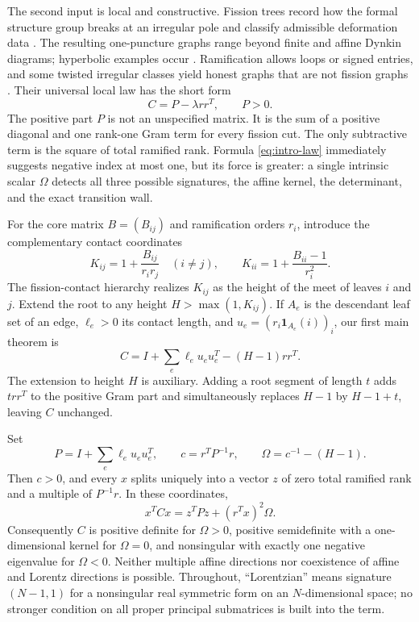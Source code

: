 \documentclass[11pt,a4paper]{amsart}
\theoremstyle{plain}
\theoremstyle{definition}
\newcommand{\one}{\mathbf 1}
\begin{document}
The second input is local and constructive.  Fission trees record how the formal structure group
breaks at an irregular pole and classify admissible deformation data
\cite{Boalch2008Kac,BoalchDoucotRembado2025,Boalch2025Counting}.  The resulting one-puncture graphs
range beyond finite and affine Dynkin diagrams; hyperbolic examples occur
\cite{Boalch2012Simply,Boalch2025Counting}.  Ramification allows loops or signed entries, and some
twisted irregular classes yield honest graphs that are not fission graphs
\cite{Doucot2025Graphs}.  Their universal local law has the short form
\begin{equation}\label{eq:intro-law}
 \boxed{\quad C=P-\lambda rr^T,\qquad P>0.\quad}
\end{equation}
The positive part $P$ is not an unspecified matrix.  It is the sum of a positive diagonal and one
rank-one Gram term for every fission cut.  The only subtractive term is the square of total
ramified rank.  Formula \eqref{eq:intro-law} immediately suggests negative index at most one, but
its force is greater: a single intrinsic scalar $\Omega$ detects all three possible signatures,
the affine kernel, the determinant, and the exact transition wall.

For the core matrix $B=(B_{ij})$ and ramification orders $r_i$, introduce the complementary
contact coordinates
\begin{equation}\label{eq:intro-K}
 K_{ij}=1+\frac{B_{ij}}{r_ir_j}\quad(i\ne j),\qquad
 K_{ii}=1+\frac{B_{ii}-1}{r_i^2}.
\end{equation}
The fission-contact hierarchy realizes $K_{ij}$ as the height of the meet of leaves $i$ and $j$.
Extend the root to any height $H>\max(1,K_{ij})$.  If $A_e$ is the descendant leaf set of an edge,
$\ell_e>0$ its contact length, and $u_e=(r_i\one_{A_e}(i))_i$, our first main theorem is
\begin{equation}\label{eq:intro-factor}
 C=I+\sum_e\ell_eu_eu_e^T-(H-1)rr^T.
\end{equation}
The extension to height $H$ is auxiliary.  Adding a root segment of length $t$ adds $t rr^T$ to
the positive Gram part and simultaneously replaces $H-1$ by $H-1+t$, leaving $C$ unchanged.

Set
\begin{equation}\label{eq:intro-capacity}
 P=I+\sum_e\ell_eu_eu_e^T,\qquad
 c=r^TP^{-1}r,\qquad
 \Omega=c^{-1}-(H-1).
\end{equation}
Then $c>0$, and every $x$ splits uniquely into a vector $z$ of zero total ramified rank and a
multiple of $P^{-1}r$.  In these coordinates,
\begin{equation}\label{eq:intro-centered}
 x^TCx=z^TPz+(r^Tx)^2\Omega.
\end{equation}
Consequently $C$ is positive definite for $\Omega>0$, positive semidefinite with a one-dimensional
kernel for $\Omega=0$, and nonsingular with exactly one negative eigenvalue for $\Omega<0$.
Neither multiple affine directions nor coexistence of affine and Lorentz directions is possible.
Throughout, ``Lorentzian'' means signature $(N-1,1)$ for a nonsingular real symmetric form on an
$N$-dimensional space; no stronger condition on all proper principal submatrices is built into the
term.
\end{document}

